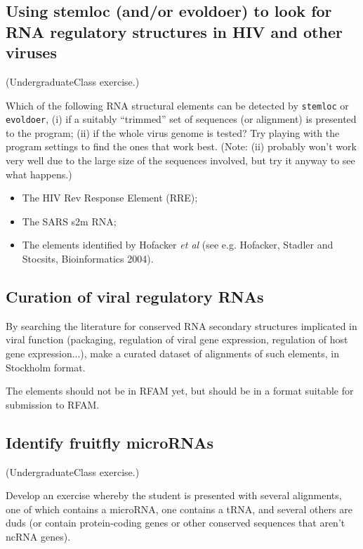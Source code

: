 \documentclass{article}
\begin{document}
\subsection{Using stemloc (and/or evoldoer) to look for
RNA regulatory structures in HIV and other viruses}

(UndergraduateClass exercise.)

Which of the following RNA structural elements can be detected
by {\tt stemloc} or {\tt evoldoer},
(i) if a suitably ``trimmed'' set of sequences (or alignment)
is presented to the program;
(ii) if the whole virus genome is tested?
Try playing with the program settings to find the ones that work best.
(Note: (ii) probably won't work very well due to the large size of
the sequences involved, but try it anyway to see what happens.)

\begin{itemize}
\item The HIV Rev Response Element (RRE);
\item The SARS s2m RNA;
\item The elements identified by Hofacker {\em et al}
(see e.g. Hofacker, Stadler and Stocsits, Bioinformatics 2004).
\end{itemize}

\subsection{Curation of viral regulatory RNAs}

By searching the literature for conserved RNA secondary structures
implicated in viral function (packaging, regulation of viral gene expression,
regulation of host gene expression...),
make a curated dataset of alignments of such elements,
in Stockholm format.

The elements should not be in RFAM yet, but should be
in a format suitable for submission to RFAM.


\subsection{Identify fruitfly microRNAs}

(UndergraduateClass exercise.)

Develop an exercise whereby the student is presented with several
alignments, one of which contains a microRNA, one contains a tRNA,
and several others are duds (or contain protein-coding genes or
other conserved sequences that aren't ncRNA genes).
\end{document}
